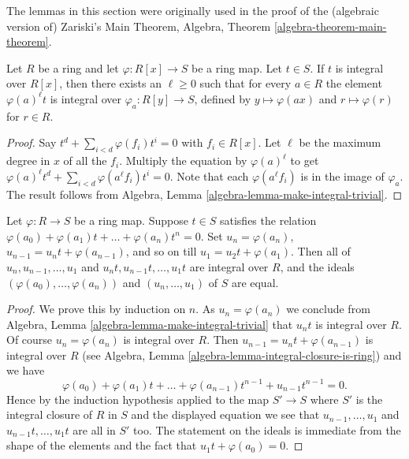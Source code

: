 \noindent
The lemmas in this section were originally used in the proof of the
(algebraic version of) Zariski's Main Theorem,
Algebra, Theorem \ref{algebra-theorem-main-theorem}.

\begin{lemma}
\label{lemma-change-equation-multiply}
Let $R$ be a ring and let $\varphi : R[x] \to S$ be
a ring map. Let $t \in S$. If $t$ is integral over
$R[x]$, then there exists an $\ell \geq 0$ such that
for every $a \in R$ the element $\varphi(a)^\ell t$
is integral over $\varphi_a : R[y] \to S$, defined by
$y \mapsto \varphi(ax)$ and $r \mapsto \varphi(r)$
for $r\in R$.
\end{lemma}

\begin{proof}
Say $t^d + \sum_{i < d} \varphi(f_i)t^i = 0$
with $f_i \in R[x]$. Let $\ell$ be the maximum degree
in $x$ of all the $f_i$. Multiply the equation
by $\varphi(a)^\ell$ to get
$\varphi(a)^\ell t^d + \sum_{i < d} \varphi(a^\ell f_i)t^i = 0$.
Note that each $\varphi(a^\ell f_i)$ is in the image of
$\varphi_a$. The result follows from
Algebra, Lemma \ref{algebra-lemma-make-integral-trivial}.
\end{proof}

\begin{lemma}
\label{lemma-make-integral-less-trivial}
Let $\varphi : R \to S$ be a ring map.
Suppose $t \in S$ satisfies the
relation $\varphi(a_0) + \varphi(a_1)t + \ldots + \varphi(a_n) t^n = 0$.
Set $u_n = \varphi(a_n)$, $u_{n-1} = u_n t + \varphi(a_{n-1})$,
and so on till $u_1 = u_2 t + \varphi(a_1)$.
Then all of $u_n, u_{n-1}, \ldots, u_1$ and
$u_nt, u_{n-1}t, \ldots, u_1t$ are integral over $R$,
and the ideals $(\varphi(a_0), \ldots, \varphi(a_n))$ and
$(u_n, \ldots, u_1)$ of $S$ are equal.
\end{lemma}

\begin{proof}
We prove this by induction on $n$. As $u_n = \varphi(a_n)$ we
conclude from
Algebra, Lemma \ref{algebra-lemma-make-integral-trivial}
that $u_nt$ is integral over $R$. Of course
$u_n = \varphi(a_n)$ is integral over $R$. Then
$u_{n - 1} = u_n t  + \varphi(a_{n - 1})$ is integral over $R$ (see
Algebra, Lemma \ref{algebra-lemma-integral-closure-is-ring})
and we have
$$
\varphi(a_0) + \varphi(a_1)t + \ldots + \varphi(a_{n - 1})t^{n - 1} +
u_{n - 1}t^{n - 1} = 0.
$$
Hence by the induction hypothesis applied to the map
$S' \to S$ where $S'$ is the integral closure of $R$ in $S$
and the displayed equation we see that
$u_{n-1}, \ldots, u_1$ and $u_{n-1}t, \ldots, u_1t$
are all in $S'$ too. The statement on the ideals is immediate from the
shape of the elements and the fact that $u_1t + \varphi(a_0) = 0$.
\end{proof}

